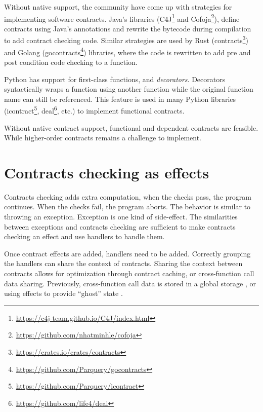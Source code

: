 Without native support, the community have come up with strategies for implementing
software contracts. Java's libraries (C4J\footnote{\href{https://c4j-team.github.io/C4J/index.html}{https://c4j-team.github.io/C4J/index.html}}
and
Cofoja\footnote{\href{https://github.com/nhatminhle/cofoja}{https://github.com/nhatminhle/cofoja}}),
define contracts using Java's annotations and rewrite the bytecode during
compilation to add contract checking code. Similar strategies are used by Rust
(contracts\footnote{\href{https://crates.io/crates/contracts}{https://crates.io/crates/contracts}})
and Golang (gocontracts\footnote{\href{https://github.com/Parquery/gocontracts}{https://github.com/Parquery/gocontracts}})
libraries, where the code is rewritten to add pre and post condition code
checking to a function.

Python has support for first-class functions, and \textit{decorators}.
Decorators syntactically wraps a function using another function while
the original function name can still be referenced. This feature is used in many
Python libraries
(icontract\footnote{\href{https://github.com/Parquery/icontract}{https://github.com/Parquery/icontract}},
deal\footnote{\href{https://github.com/life4/deal}{https://github.com/life4/deal}},
etc.) to implement functional contracts.

Without native contract support, functional and dependent contracts are
feasible. While higher-order contracts remains a challenge to implement.

\section{Contracts checking as effects}

Contracts checking adds extra computation, when the checks pass, the program
continues. When the checks fail, the program aborts. The behavior is similar to
throwing an exception. Exception is one kind of side-effect. The similarities
between exceptions and contracts checking are sufficient to make contracts
checking an effect and use handlers to handle them.

Once contract effects are added, handlers need to be added. Correctly grouping
the handlers can share the context of contracts. Sharing the context between
contracts allows for optimization through contract caching, or cross-function
call data sharing. Previously, cross-function call data is stored in a global
storage \cite{MOY_FELLEISEN_2023}, or using effects to provide ``ghost'' state
\cite{10.1145/3632930}.

